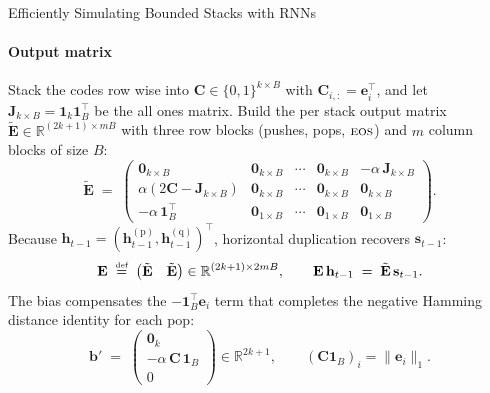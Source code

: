 \begin{question}{Efficiently Simulating Bounded Stacks with RNNs}
\begin{subquestion}
    \paragraph{Output matrix} Stack the codes row wise into $\mathbf{C} \in \{0, 1\}^{k \times B}$ with $\mathbf{C}_{i,:} = \mathbf{e}_i^\top$, and let $\mathbf{J}_{k \times B} = \mathbf{1}_k\mathbf{1}_B^\top$ be the all ones matrix. 
    Build the per stack output matrix $\tilde{\mathbf{E}} \in \mathbb{R}^{(2k+1) \times mB}$ with three row blocks (pushes, pops, $\eos$) and $m$ column blocks of size $B$:
    \[
        \tilde{\mathbf{E}} \;=\;
        \begin{pmatrix}
            \mathbf{0}_{k\times B} & \mathbf{0}_{k\times B} & \cdots & \mathbf{0}_{k\times B} & -\alpha\,\mathbf{J}_{k\times B} \\[2pt]
            \alpha(2\mathbf{C} - \mathbf{J}_{k\times B}) & \mathbf{0}_{k\times B} & \cdots & \mathbf{0}_{k\times B} & \mathbf{0}_{k\times B} \\[2pt]
            -\alpha\,\mathbf{1}_B^\top & \mathbf{0}_{1\times B} & \cdots & \mathbf{0}_{1\times B} & \mathbf{0}_{1\times B}
        \end{pmatrix}.
    \]
    Because $\mathbf{h}_{t-1} = (\mathbf{h}_{t-1}^{(\text{p})}, \mathbf{h}_{t-1}^{(\text{q})})^\top$, horizontal duplication recovers $\mathbf{s}_{t-1}$:
    \[
        \mathbf{E} \;\mathrel{\stackrel{\textnormal{\tiny def}}{=}}\; \begin{pmatrix} \tilde{\mathbf{E}} & \tilde{\mathbf{E}} \end{pmatrix} \in \mathbb{R}^{(2k+1) \times 2mB}, \qquad \mathbf{E}\,\mathbf{h}_{t-1} \;=\; \tilde{\mathbf{E}}\,\mathbf{s}_{t-1}.
    \]
    The bias compensates the $-\mathbf{1}_B^\top \mathbf{e}_i$ term that completes the negative Hamming distance identity for each pop:
    \[
        \mathbf{b}' \;=\; \begin{pmatrix} \mathbf{0}_{k} \\ -\alpha\,\mathbf{C}\,\mathbf{1}_B \\ 0 \end{pmatrix} \in \mathbb{R}^{2k+1},
        \qquad (\mathbf{C}\mathbf{1}_B)_i = \|\mathbf{e}_i\|_1.
    \]


\end{subquestion}
\end{question}
